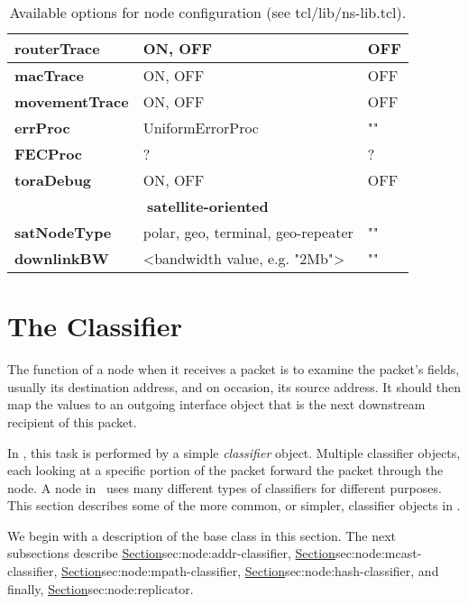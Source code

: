 \begin{table}[ht]
\begin{center}
{\begin{tabular}{|l|l|l|}
{\bf routerTrace} & ON, OFF & OFF \\\hline
{\bf macTrace} & ON, OFF & OFF \\\hline
{\bf movementTrace} & ON, OFF & OFF \\\hline
{\bf errProc} & UniformErrorProc & "" \\\hline
{\bf FECProc} &? & ? \\\hline
{\bf toraDebug} & ON, OFF & OFF \\\hline
\multicolumn{3}{|c|}{\bf satellite-oriented} \\\hline
{\bf satNodeType} & polar, geo, terminal, geo-repeater & "" \\\hline
{\bf downlinkBW} & <bandwidth value, e.g. "2Mb"> & ""\\\hline
\end{tabular}
}
\end{center}
\caption{Available options for node configuration (see tcl/lib/ns-lib.tcl).
}
\end{table}
\normalsize

\section{The Classifier}
\label{sec:node:classifiers}

The function of a node when it receives a packet is to examine
the packet's fields, usually its destination address, and
on occasion, its source address.
It should then map the values to an outgoing interface object
that is the next downstream recipient of this packet.

In \ns, this task is performed by a simple \emph{classifier} object.
Multiple classifier objects,
each looking at a specific portion of the packet
forward the packet through the node.
A node in \ns\ uses many different types of classifiers for different purposes.
This section describes some of the more common, or simpler,
classifier objects in \ns.

We begin with a description of the base class in this section.
The next subsections describe
\href{the address classifier}{Section}{sec:node:addr-classifier},
\href{the multicast classifier}{Section}{sec:node:mcast-classifier},
\href{the multipath classifier}{Section}{sec:node:mpath-classifier}, 
\href{the hash classifier}{Section}{sec:node:hash-classifier}, and
finally, \href{the replicator}{Section}{sec:node:replicator}.

